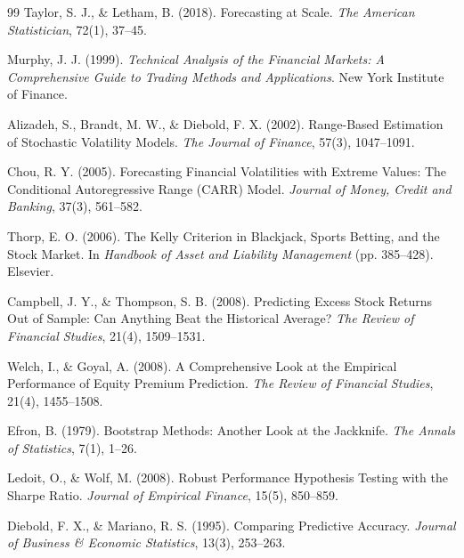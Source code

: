 \documentclass[11pt,a4paper]{article}
\begin{document}
\begin{thebibliography}{99}
Taylor, S. J., \& Letham, B. (2018).
\newblock Forecasting at Scale.
\newblock \textit{The American Statistician}, 72(1), 37--45.

Murphy, J. J. (1999).
\newblock \textit{Technical Analysis of the Financial Markets: A Comprehensive Guide to Trading Methods and Applications}.
\newblock New York Institute of Finance.

Alizadeh, S., Brandt, M. W., \& Diebold, F. X. (2002).
\newblock Range-Based Estimation of Stochastic Volatility Models.
\newblock \textit{The Journal of Finance}, 57(3), 1047--1091.

Chou, R. Y. (2005).
\newblock Forecasting Financial Volatilities with Extreme Values: The Conditional Autoregressive Range (CARR) Model.
\newblock \textit{Journal of Money, Credit and Banking}, 37(3), 561--582.

Thorp, E. O. (2006).
\newblock The Kelly Criterion in Blackjack, Sports Betting, and the Stock Market.
\newblock In \textit{Handbook of Asset and Liability Management} (pp. 385--428). Elsevier.

Campbell, J. Y., \& Thompson, S. B. (2008).
\newblock Predicting Excess Stock Returns Out of Sample: Can Anything Beat the Historical Average?
\newblock \textit{The Review of Financial Studies}, 21(4), 1509--1531.

Welch, I., \& Goyal, A. (2008).
\newblock A Comprehensive Look at the Empirical Performance of Equity Premium Prediction.
\newblock \textit{The Review of Financial Studies}, 21(4), 1455--1508.


Efron, B. (1979).
\newblock Bootstrap Methods: Another Look at the Jackknife.
\newblock \textit{The Annals of Statistics}, 7(1), 1--26.

Ledoit, O., \& Wolf, M. (2008).
\newblock Robust Performance Hypothesis Testing with the Sharpe Ratio.
\newblock \textit{Journal of Empirical Finance}, 15(5), 850--859.

Diebold, F. X., \& Mariano, R. S. (1995).
\newblock Comparing Predictive Accuracy.
\newblock \textit{Journal of Business \& Economic Statistics}, 13(3), 253--263.


\end{thebibliography}
\end{document}
